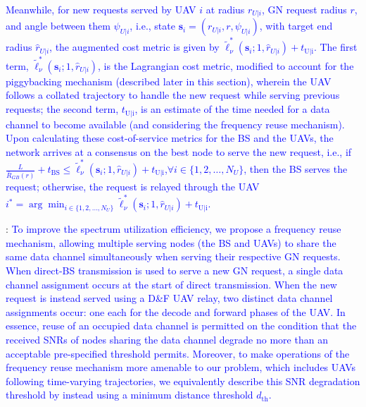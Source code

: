 \documentclass[12pt, draftcls, onecolumn]{IEEEtran}
\theoremstyle{plain}
\theoremstyle{definition}
\theoremstyle{remark}
\newcommand\hlt[1]{\textcolor{blue}{#1}}
\begin{document}
\hlt{Meanwhile, for new requests served by UAV $i$ at radius $r_{U|i}$, GN request radius $r$, and angle between them $\psi_{U|i}$, i.e., state $\mathbf s_i = (r_{U|i}, r, \psi_{U|i})$, with target end radius $\hat r_{U|i}$, the augmented cost metric is given by $\tilde{\ell}_{\nu}^* (\mathbf s_i; 1, \hat r_{U|i}) + t_{\mathrm{U|i}}$. The first term, $\tilde{\ell}_{\nu}^* (\mathbf s_i; 1, \hat r_{U|i})$, is the Lagrangian cost metric, modified to account for the piggybacking mechanism (described later in this section), wherein the UAV follows a collated trajectory to handle the new request while serving previous requests; the second term, $t_{\mathrm{U|i}}$, is an estimate of the time needed for a data channel to become available (and considering the frequency reuse mechanism). Upon calculating these cost-of-service metrics for the BS and the UAVs, the network arrives at a consensus on the best node to serve the new request, i.e., if $\frac{L}{\bar{R}_{GB} (r)}{+}t_{\mathrm{BS}}{\leq}\tilde{\ell}_{\nu}^* (\mathbf s_i; 1, \hat r_{U|i}){+}t_{\mathrm{U|i}}$,${\forall}i{\in}\{1,2,{\dots},N_U\}$, then the BS serves the request; otherwise, the request is relayed through the UAV $i^*{=}\arg\min_{i{\in}\{1,2,{\dots},N_U\}}\tilde{\ell}_{\nu}^* (\mathbf s_i; 1, \hat r_{U|i}) + t_{\mathrm{U|i}}$.}

\label{freq_reuse_label}
\noindent{\hlt{\textbf{Frequency Reuse}}}: \hlt{To improve the spectrum utilization efficiency, we propose a frequency reuse mechanism, allowing multiple serving nodes (the BS and UAVs) to share the same data channel simultaneously when serving their respective GN requests. When direct-BS transmission is used to serve a new GN request, a single data channel assignment occurs at the start of direct transmission. When the new request is instead served using a D\&F UAV relay, two distinct data channel assignments occur: one each for the decode and forward phases of the UAV. In essence, reuse of an occupied data channel is permitted on the condition that the received SNRs of nodes sharing the data channel degrade no more than an acceptable pre-specified threshold permits. Moreover, to make operations of the frequency reuse mechanism more amenable to our problem, which includes UAVs following time-varying trajectories, we equivalently describe this SNR degradation threshold by instead using a minimum distance threshold $d_{\mathrm{th}}$.}
\end{document}
